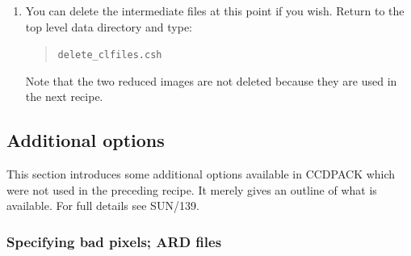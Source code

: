 \documentclass[twoside,11pt]{article}
\newcommand{\xref}[3]{#1}
\begin{document}
\begin{enumerate}
   The input files are the two de-biassed target images in subdirectory
   {\tt targets}.  The flat fielded images will be created in the same
   directory and with the same basic file names but with `{\tt \_flt}'
   appended.  That is, the following two files will be created:

  \begin{quote}
   {\tt targets/ngc2336\_r\_1\_deb\_flt.sdf \\
   targets/ngc2336\_r\_2\_deb\_flt.sdf}
  \end{quote}

   These images should be a true representation of the brightness
   distribution in the region of sky observed (subject to the constraints
   of atmospheric seeing and instrumental resolution, of course).  The
   images can, for example, be displayed with GAIA.  Type:

  \begin{quote}
   {\tt gaia targets/ngc2336\_r\_2\_deb\_flt.sdf \&}
  \end{quote}

   After setting the {\sf Auto Cut} level, {\sf Magnification} and colour
   table (see the recipe in Section~\ref{DISPLAY}) the reduced image should
   appear similar to the ones in the previous recipe (see
   Figure~\ref{GAIAREDUCE}).

  \item You can delete the intermediate files at this point if you wish.
   Return to the top level data directory and type:

  \begin{quote}
   {\tt delete\_clfiles.csh}
  \end{quote}

   Note that the two reduced images are not deleted because they are used
   in the next recipe.

\end{enumerate}

\subsection{\label{ADDOPT}Additional options}

This section introduces some additional options available in CCDPACK
which were not used in the preceding recipe.  It merely gives an outline
of what is available.  For full details see
\xref{SUN/139}{sun139}{}\/\cite{SUN139}.

\subsubsection{Specifying bad pixels; ARD files}
\end{document}
